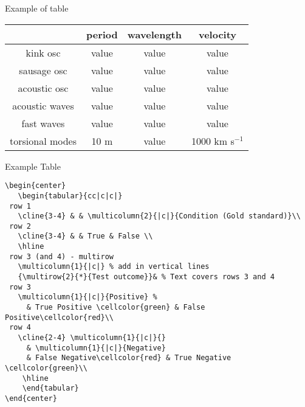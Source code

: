 \documentclass[9pt]{beamer}
\begin{document}
\begin{frame}{Example of table}
    \begin{center}
        \begin{tabular}{c|c|c|c|}
            \cline{2-4} & {\textbf{period}} & {\textbf{wavelength}} &
                {\textbf{velocity}}\\
            \hline \multicolumn{0}{|c|}{kink osc} & value & value & value\\
            \hline \multicolumn{0}{|c|}{sausage osc} & value & value & value\\
            \hline \multicolumn{0}{|c|}{acoustic osc} & value & value & value\\
            \hline \multicolumn{0}{|c|}{acoustic waves} & value & value & value\\
            \hline \multicolumn{0}{|c|}{fast waves} & value & value & value\\
            \hline \multicolumn{0}{|c|}{torsional modes} & 10 m & value &
                1000 km s$^{-1}$\\
            \hline
        \end{tabular}
    \end{center}
\end{frame}%
\begin{frame}[fragile=singleslide]{Example Table}
    \begin{verbatim}
\begin{center}
   \begin{tabular}{cc|c|c|}
 row 1
   \cline{3-4} & & \multicolumn{2}{|c|}{Condition (Gold standard)}\\
 row 2
   \cline{3-4} & & True & False \\
   \hline
 row 3 (and 4) - multirow
   \multicolumn{1}{|c|} % add in vertical lines
   {\multirow{2}{*}{Test outcome}}& % Text covers rows 3 and 4
 row 3
   \multicolumn{1}{|c|}{Positive} %
     & True Positive \cellcolor{green} & False Positive\cellcolor{red}\\
 row 4
   \cline{2-4} \multicolumn{1}{|c|}{}
     & \multicolumn{1}{|c|}{Negative}
     & False Negative\cellcolor{red} & True Negative \cellcolor{green}\\
    \hline
    \end{tabular}
\end{center}
    \end{verbatim}
\end{frame}%
\end{document}
